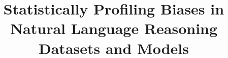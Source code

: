 \documentclass[runningheads]{llncs}
\begin{document}
%
\title{Statistically Profiling Biases in Natural Language Reasoning Datasets and Models}
%
%
%
%
\end{document}
